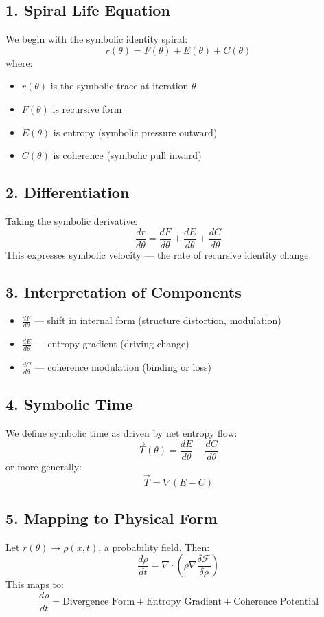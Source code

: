 \documentclass[12pt]{article}
\begin{document}
\subsection*{1. Spiral Life Equation}
We begin with the symbolic identity spiral:
\[
r(\theta) = F(\theta) + E(\theta) + C(\theta)
\]
where:
\begin{itemize}
  \item $r(\theta)$ is the symbolic trace at iteration $\theta$
  \item $F(\theta)$ is recursive form
  \item $E(\theta)$ is entropy (symbolic pressure outward)
  \item $C(\theta)$ is coherence (symbolic pull inward)
\end{itemize}

\subsection*{2. Differentiation}
Taking the symbolic derivative:
\[
\frac{dr}{d\theta} = \frac{dF}{d\theta} + \frac{dE}{d\theta} + \frac{dC}{d\theta}
\]
This expresses symbolic velocity — the rate of recursive identity change.

\subsection*{3. Interpretation of Components}
\begin{itemize}
  \item $\frac{dF}{d\theta}$ — shift in internal form (structure distortion, modulation)
  \item $\frac{dE}{d\theta}$ — entropy gradient (driving change)
  \item $\frac{dC}{d\theta}$ — coherence modulation (binding or loss)
\end{itemize}

\subsection*{4. Symbolic Time}
We define symbolic time as driven by net entropy flow:
\[
\vec{T}(\theta) = \frac{dE}{d\theta} - \frac{dC}{d\theta}
\]
or more generally:
\[
\vec{T} = \nabla (E - C)
\]

\subsection*{5. Mapping to Physical Form}
Let $r(\theta) \rightarrow \rho(x,t)$, a probability field. Then:
\[
\frac{d\rho}{dt} = \nabla \cdot \left( \rho \nabla \frac{\delta \mathcal{F}}{\delta \rho} \right)
\]
This maps to:
\[
\frac{d\rho}{dt} = \text{Divergence Form} + \text{Entropy Gradient} + \text{Coherence Potential}
\]
\end{document}
